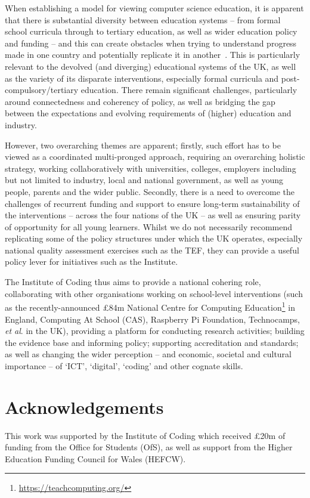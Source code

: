 \documentclass[conference]{IEEEtran}
\begin{document}
When establishing a model for viewing computer science education, it
is apparent that there is substantial diversity between education
systems -- from formal school curricula through to tertiary education,
as well as wider education policy and funding -- and this can create
obstacles when trying to understand progress made in one country and
potentially replicate it in another~\cite{hubwieser:2013}. This is
particularly relevant to the devolved (and diverging) educational
systems of the UK, as well as the variety of its disparate
interventions, especially formal curricula and
post-compulsory/tertiary education.  There remain significant
challenges, particularly around connectedness and coherency of policy,
as well as bridging the gap between the expectations and evolving
requirements of (higher) education and industry.

However, two overarching themes are apparent; firstly, such effort has
to be viewed as a coordinated multi-pronged approach, requiring an
overarching holistic strategy, working collaboratively with
universities, colleges, employers including but not limited to
industry, local and national government, as well as young people,
parents and the wider public. Secondly, there is a need to overcome
the challenges of recurrent funding and support to ensure long-term
sustainability of the interventions -- across the four nations of the
UK -- as well as ensuring parity of opportunity for all young
learners. Whilst we do not necessarily recommend replicating some of
the policy structures under which the UK operates, especially national
quality assessment exercises such as the TEF, they can provide a
useful policy lever for initiatives such as the Institute.

The Institute of Coding thus aims to provide a national cohering role,
collaborating with other organisations working on school-level
interventions (such as the recently-announced \pounds84m National
Centre for Computing
Education\footnote{\url{https://teachcomputing.org/}} in England,
Computing At School (CAS), Raspberry Pi Foundation, Technocamps, {\it
et al\/}. in the UK), providing a platform for conducting research
activities; building the evidence base and informing policy;
supporting accreditation and standards; as well as changing the wider
perception -- and economic, societal and cultural importance -- of
`ICT', `digital', `coding' and other cognate skills.

\section*{Acknowledgements}

This work was supported by the Institute of Coding which received
\pounds20m of funding from the Office for Students (OfS), as well as
support from the Higher Education Funding Council for Wales (HEFCW).


 
\end{document}
